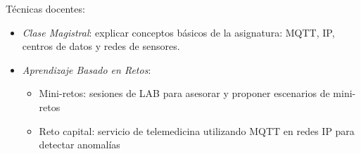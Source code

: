 \documentclass[xcolor=table,xcolor=x11names]{beamer}
\begin{document}
\begin{frame}{\subsecname}
    Técnicas docentes:
    \begin{itemize}
        \item \emph{Clase Magistral}: explicar
            conceptos básicos de la asignatura:
            MQTT, IP, centros de datos y redes de sensores.
        \item \emph{Aprendizaje Basado en Retos}:
            \begin{itemize}
                \item Mini-retos: sesiones de LAB para
                    asesorar y proponer escenarios de
                    mini-retos
                \item Reto capital: servicio de telemedicina
utilizando MQTT en redes IP para detectar anomalías
            \end{itemize}
    \end{itemize}
\end{frame}
\end{document}
